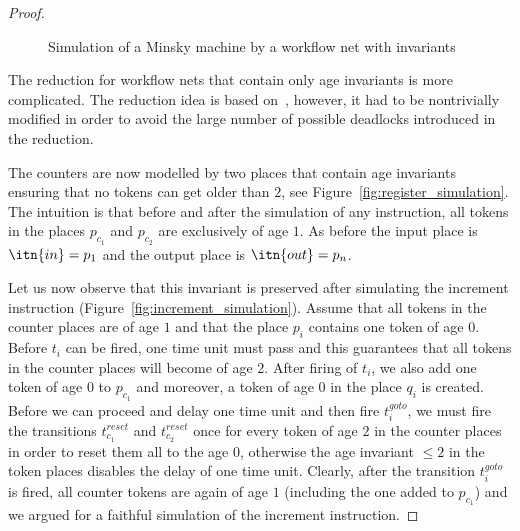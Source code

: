 \begin{proof}
\begin{figure}[t!]
  \caption{Simulation of a Minsky machine by a workflow net with invariants}%
  \label{fig:cont}%
\end{figure}


The reduction for workflow nets that contain only age invariants
is more complicated. The reduction idea is based on~\cite{memics_paper}, 
however, it had to be nontrivially modified in order to avoid the
large number of possible deadlocks introduced in the reduction.

The counters are now modelled by two places that contain age invariants
ensuring that no tokens can get older than $2$, see 
Figure~\ref{fig:register_simulation}. The intuition is that
before and after the simulation of any instruction, all tokens in
the places $p_{c_1}$ and $p_{c_2}$ are exclusively of age $1$. 
As before the input place is $\itn{in}=p_1$ and the output place
is $\itn{out}=p_n$.

Let us now observe
that this invariant is preserved after simulating the 
increment instruction (Figure~\ref{fig:increment_simulation}).
Assume that all tokens in the counter places are of age $1$ and that
the place $p_i$ contains one token of age $0$.
Before $t_i$ can be fired, one time unit must pass and this guarantees
that all tokens in the counter places will become of age $2$. After firing
of $t_i$, we also add one token of age $0$ to $p_{c_1}$ 
and moreover, a token of age $0$ in the place $q_i$ is created.
Before we can proceed and delay one time unit 
and then fire $t_i^{\mathit goto}$, we must fire the
transitions $t_{c_1}^{\mathit reset}$ and $t_{c_2}^{\mathit reset}$ once
for every token of age $2$ in the counter places in order to reset 
them all to the age $0$, otherwise the age invariant $\leq 2$ in the token 
places disables the delay of one time unit. Clearly, after the transition 
$t_i^{\mathit goto}$ is fired, all counter tokens are again of age $1$
(including the one added to $p_{c_1}$) and we argued for a faithful simulation
of the increment instruction.


\end{proof}
